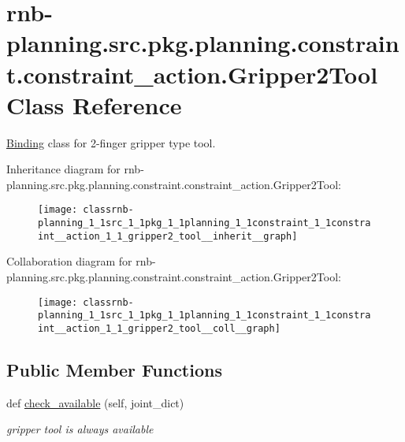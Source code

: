 \hypertarget{classrnb-planning_1_1src_1_1pkg_1_1planning_1_1constraint_1_1constraint__action_1_1_gripper2_tool}{}\section{rnb-\/planning.src.\+pkg.\+planning.\+constraint.\+constraint\+\_\+action.\+Gripper2\+Tool Class Reference}
\label{classrnb-planning_1_1src_1_1pkg_1_1planning_1_1constraint_1_1constraint__action_1_1_gripper2_tool}


\hyperlink{classrnb-planning_1_1src_1_1pkg_1_1planning_1_1constraint_1_1constraint__action_1_1_binding}{Binding} class for 2-\/finger gripper type tool.  




Inheritance diagram for rnb-\/planning.src.\+pkg.\+planning.\+constraint.\+constraint\+\_\+action.\+Gripper2\+Tool\+:
\nopagebreak
\begin{figure}[H]
\begin{center}
\leavevmode
\texttt{[image: classrnb-planning\_1\_1src\_1\_1pkg\_1\_1planning\_1\_1constraint\_1\_1constraint\_\_action\_1\_1\_gripper2\_tool\_\_inherit\_\_graph]}
\end{center}
\end{figure}


Collaboration diagram for rnb-\/planning.src.\+pkg.\+planning.\+constraint.\+constraint\+\_\+action.\+Gripper2\+Tool\+:
\nopagebreak
\begin{figure}[H]
\begin{center}
\leavevmode
\texttt{[image: classrnb-planning\_1\_1src\_1\_1pkg\_1\_1planning\_1\_1constraint\_1\_1constraint\_\_action\_1\_1\_gripper2\_tool\_\_coll\_\_graph]}
\end{center}
\end{figure}
\subsection*{Public Member Functions}
\begin{DoxyCompactItemize}
\item 
\mbox{\label{classrnb-planning_1_1src_1_1pkg_1_1planning_1_1constraint_1_1constraint__action_1_1_gripper2_tool_a84d9efc98a2fd3a7563754bc107896c2}} 
def \hyperlink{classrnb-planning_1_1src_1_1pkg_1_1planning_1_1constraint_1_1constraint__action_1_1_gripper2_tool_a84d9efc98a2fd3a7563754bc107896c2}{check\+\_\+available} (self, joint\+\_\+dict)
\begin{DoxyCompactList}\small\item\em gripper tool is always available \end{DoxyCompactList}\end{DoxyCompactItemize}
